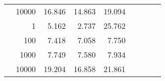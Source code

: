 \begin{table}
\begin{tabular}{rrrrrrrrr}
	            
					 &  
					 
					\multirow{ 1 }{*}{ 10000 } &
					
						
							    
							    
	                           16.846 & 14.863 & 19.094  \\
	                
	            
	        
				\noalign{\smallskip}\hline
				\multirow{ 4 }{*}{ 2000000 } &
				
					
					 
					\multirow{ 1 }{*}{ 1 } &
					
						
							    
							    
	                           5.162 & 2.737 & 25.762  \\
	                
	            
					 &  
					 
					\multirow{ 1 }{*}{ 100 } &
					
						
							    
							    
	                           7.418 & 7.058 & 7.750  \\
	                
	            
					 &  
					 
					\multirow{ 1 }{*}{ 1000 } &
					
						
							    
							    
	                           7.749 & 7.580 & 7.934  \\
	                
	            
					 &  
					 
					\multirow{ 1 }{*}{ 10000 } &
					
						
							    
							    
	                           19.204 & 16.858 & 21.861  \\
	                
	            
	        

\hline

\end{tabular}
\end{table}
\clearpage


	    


